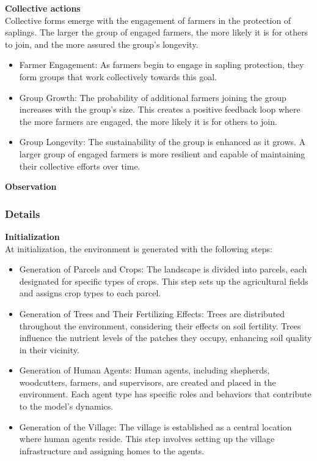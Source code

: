 \documentclass{article}
\begin{document}
        \textbf{Collective actions}\\

        Collective forms emerge with the engagement of farmers in the protection of saplings. The larger the group of engaged farmers, the more likely it is for others to join, and the more assured the group's longevity.

        \begin{itemize}
            \item Farmer Engagement: As farmers begin to engage in sapling protection, they form groups that work collectively towards this goal.
            \item Group Growth: The probability of additional farmers joining the group increases with the group's size. This creates a positive feedback loop where the more farmers are engaged, the more likely it is for others to join.
            \item Group Longevity: The sustainability of the group is enhanced as it grows. A larger group of engaged farmers is more resilient and capable of maintaining their collective efforts over time.\\
        \end{itemize}


        \textbf{Observation}\\

    \subsubsection{Details}
        
        \textbf{Initialization}\\
        At initialization, the environment is generated with the following steps:

        \begin{itemize}
            \item Generation of Parcels and Crops: The landscape is divided into parcels, each designated for specific types of crops. This step sets up the agricultural fields and assigns crop types to each parcel.
            \item Generation of Trees and Their Fertilizing Effects: Trees are distributed throughout the environment, considering their effects on soil fertility. Trees influence the nutrient levels of the patches they occupy, enhancing soil quality in their vicinity.
            \item Generation of Human Agents: Human agents, including shepherds, woodcutters, farmers, and supervisors, are created and placed in the environment. Each agent type has specific roles and behaviors that contribute to the model's dynamics.
            \item Generation of the Village: The village is established as a central location where human agents reside. This step involves setting up the village infrastructure and assigning homes to the agents.
        \end{itemize}
\end{document}
